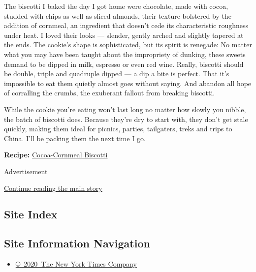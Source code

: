 The biscotti I baked the day I got home were chocolate, made with cocoa,
studded with chips as well as sliced almonds, their texture bolstered by
the addition of cornmeal, an ingredient that doesn't cede its
characteristic roughness under heat. I loved their looks --- slender,
gently arched and slightly tapered at the ends. The cookie's shape is
sophisticated, but its spirit is renegade: No matter what you may have
been taught about the impropriety of dunking, these sweets demand to be
dipped in milk, espresso or even red wine. Really, biscotti should be
double, triple and quadruple dipped --- a dip a bite is perfect. That
it's impossible to eat them quietly almost goes without saying. And
abandon all hope of corralling the crumbs, the exuberant fallout from
breaking biscotti.

While the cookie you're eating won't last long no matter how slowly you
nibble, the batch of biscotti does. Because they're dry to start with,
they don't get stale quickly, making them ideal for picnics, parties,
tailgaters, treks and trips to China. I'll be packing them the next time
I go.

\textbf{Recipe:}
\href{https://cooking.nytimes3xbfgragh.onion/recipes/1019374-cocoa-cornmeal-biscotti}{Cocoa-Cornmeal
Biscotti}

Advertisement

\protect\hyperlink{after-bottom}{Continue reading the main story}

\hypertarget{site-index}{%
\subsection{Site Index}\label{site-index}}

\hypertarget{site-information-navigation}{%
\subsection{Site Information
Navigation}\label{site-information-navigation}}

\begin{itemize}
\tightlist
\item
  \href{https://help.nytimes3xbfgragh.onion/hc/en-us/articles/115014792127-Copyright-notice}{©~2020~The
  New York Times Company}
\end{itemize}

